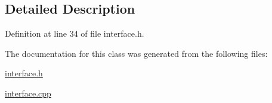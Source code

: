 \subsection{Detailed Description}


Definition at line 34 of file interface.\+h.



The documentation for this class was generated from the following files\+:\begin{DoxyCompactItemize}
\item 
\hyperlink{interface_8h}{interface.\+h}\item 
\hyperlink{interface_8cpp}{interface.\+cpp}\end{DoxyCompactItemize}
